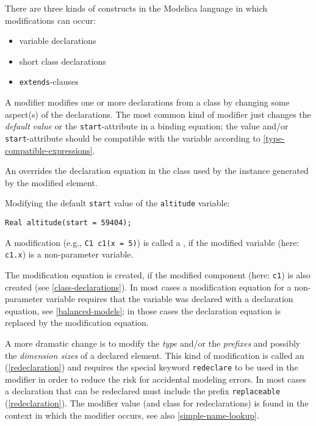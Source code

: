 There are three kinds of constructs in the Modelica language in which modifications can occur:
\begin{itemize}
\item
  variable declarations
\item
  short class declarations
\item
  \lstinline!extends!-clauses
\end{itemize}

A modifier modifies one or more declarations from a class by changing some aspect(s) of the declarations.
The most common kind of modifier just changes the \emph{default value} or the \lstinline!start!-attribute in a binding equation; the value and/or \lstinline!start!-attribute should be compatible with the variable according to \cref{type-compatible-expressions}.

An  overrides the declaration equation in the class used by the instance generated by the modified element.

\begin{example}
Modifying the default \lstinline!start! value of the \lstinline!altitude! variable:
\begin{lstlisting}[language=modelica]
Real altitude(start = 59404);
\end{lstlisting}
\end{example}

A modification (e.g., \lstinline!C1 c1(x = 5)!) is called a , if the modified variable (here: \lstinline!c1.x!) is a non-parameter variable.

\begin{nonnormative}
The modification equation is created, if the modified component (here: \lstinline!c1!) is also created (see \cref{class-declarations}). In most cases
a modification equation for a non-parameter variable requires that the variable was declared with a declaration equation, see \cref{balanced-models};
in those cases the declaration equation is replaced by the modification equation.
\end{nonnormative}

A more dramatic change is to modify the \emph{type} and/or the \emph{prefixes} and possibly the \emph{dimension sizes} of a declared element.
This kind of modification is called an  (\cref{redeclaration}) and requires the special keyword \lstinline!redeclare! to be used in the modifier in order to reduce the risk for accidental modeling errors.
In most cases a declaration that can be redeclared must include the prefix \lstinline!replaceable! (\cref{redeclaration}).
The modifier value (and class for redeclarations) is found in the context in which the modifier occurs, see also \cref{simple-name-lookup}.

